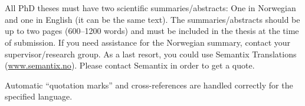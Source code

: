 \chapter{\abstractname}

All PhD theses must have two scientific summaries/abstracts:
One in Norwegian and one in English (it can be the same text).
The summaries/abstracts should be up to two pages (600--1200 words) and must be included in the thesis at the time of submission.
If you need assistance for the Norwegian summary, contact your supervisor/research group.
As a last resort, you could use Semantix Translations (\url{www.semantix.no}).
Please contact Semantix in order to get a quote.

Automatic \enquote{quotation marks} and cross-references are handled correctly for the specified language.


